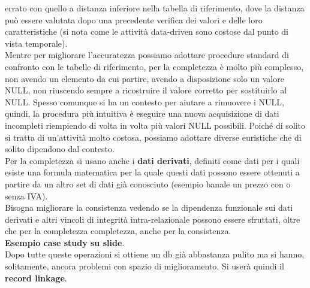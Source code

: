 \documentclass[a4paper,12pt, oneside]{book}
\begin{document}
errato con quello a distanza inferiore nella tabella di riferimento, dove la
distanza può essere valutata dopo una precedente verifica dei valori e delle
loro caratteristiche (si nota come le attività data-driven sono costose dal
punto di vista temporale). \\
Mentre per migliorare l'accuratezza possiamo adottare procedure standard di
confronto con le tabelle di riferimento, per la completezza è molto più
complesso, non avendo un elemento da cui partire, avendo a disposizione solo un
valore NULL, non riuscendo sempre a ricostruire il valore corretto per
sostituirlo al NULL. Spesso comunque si ha un contesto per aiutare a rimuovere i
NULL, quindi, la procedura più intuitiva è eseguire una nuova acquisizione di
dati incompleti riempiendo di volta in volta più valori NULL possibili. Poiché
di solito si tratta di un'attività molto costosa, 
possiamo adottare diverse euristiche che di solito dipendono dal contesto. \\
Per la completezza si usano anche i \textbf{dati derivati}, definiti come dati
per i quali esiste una formula matematica per la quale questi dati possono
essere ottenuti a partire da un altro set di dati già conosciuto (esempio banale
un prezzo con o senza IVA).\\
Bisogna migliorare la consistenza vedendo se la dipendenza funzionale sui dati
derivati e altri vincoli di integrità intra-relazionale possono essere
sfruttati, oltre che per la completezza completezza, anche per la consistenza.\\
\textbf{Esempio case study su slide}.\\
Dopo tutte queste operazioni si ottiene un db già abbastanza pulito ma si hanno,
solitamente, ancora problemi con spazio di miglioramento. Si userà quindi il
\textbf{record linkage}.\\
\end{document}
